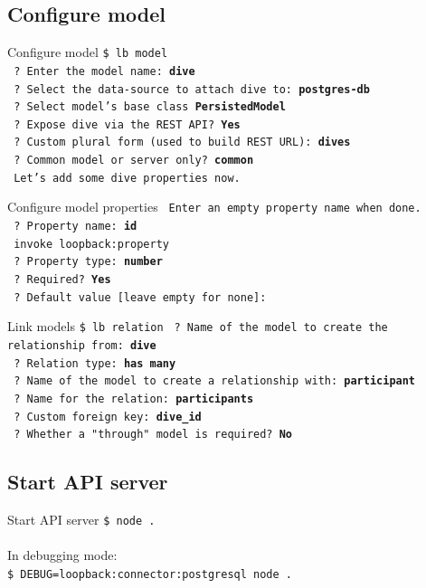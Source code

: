 \documentclass[11pt]{beamer}
\begin{document}
\subsection{Configure model}
\begin{frame}{Configure model}
\texttt{\$ lb model}\\
\texttt{ ? Enter the model name: \textbf{dive}}\\
\texttt{ ? Select the data-source to attach dive to: \textbf{postgres-db}}\\
\texttt{ ? Select model's base class \textbf{PersistedModel}}\\
\texttt{ ? Expose dive via the REST API? \textbf{Yes}}\\
\texttt{ ? Custom plural form (used to build REST URL): \textbf{dives}}\\
\texttt{ ? Common model or server only? \textbf{common}}\\
\texttt{ Let's add some dive properties now.}
\end{frame}
\begin{frame}{Configure model properties}
\texttt{    Enter an empty property name when done.}\\
\texttt{    ? Property name: \textbf{id}}\\
\texttt{       invoke   loopback:property}\\
\texttt{    ? Property type: \textbf{number}}\\
\texttt{    ? Required? \textbf{Yes}}\\
\texttt{    ? Default value [leave empty for none]: }
\end{frame}
\begin{frame}[fragile]{Link models}
\texttt{\$ lb relation}
\texttt{    ? Name of the model to create the relationship from:  \textbf{dive}}\\
\texttt{    ? Relation type: \textbf{has many}}\\
\texttt{    ? Name of the model to create a relationship with: \textbf{participant}}\\
\texttt{    ? Name for the relation: \textbf{participants}}\\
\texttt{    ? Custom foreign key: \textbf{dive\_id}}\\
\texttt{    ? Whether a "through" model is required? \textbf{No}}
\end{frame}

\subsection{Start API server}
\begin{frame}{Start API server}
\texttt{\$ node .}\\
~\\
In debugging mode:\\
\texttt{\$ DEBUG=loopback:connector:postgresql node .}
\end{frame}
\end{document}
